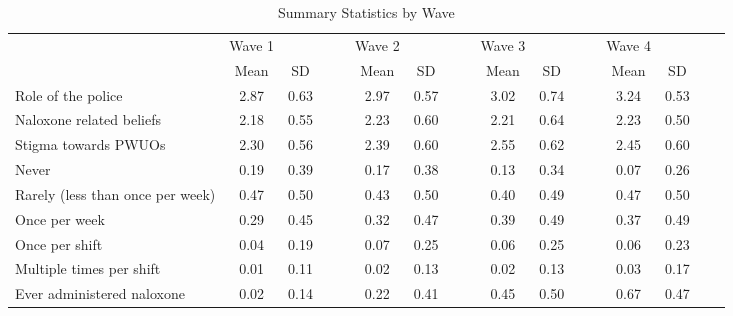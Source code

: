 \begin{sidewaystable}[htbp]\centering
\def\sym#1{\ifmmode^{#1}\else\(^{#1}\)\fi}
\caption{\centering Summary Statistics by Wave}
\begin{tabular}{l*{4}{cccc}}
\hline\hline
                &   Wave 1&         &         &         &   Wave 2&         &         &         &   Wave 3&         &         &         &   Wave 4&         &         &         \\
                &     Mean&       SD&         &         &     Mean&       SD&         &         &     Mean&       SD&         &         &     Mean&       SD&         &         \\
\hline
Role of the police&     2.87&     0.63&         &         &     2.97&     0.57&         &         &     3.02&     0.74&         &         &     3.24&     0.53&         &         \\
Naloxone related beliefs&     2.18&     0.55&         &         &     2.23&     0.60&         &         &     2.21&     0.64&         &         &     2.23&     0.50&         &         \\
Stigma towards PWUOs&     2.30&     0.56&         &         &     2.39&     0.60&         &         &     2.55&     0.62&         &         &     2.45&     0.60&         &         \\
Never           &     0.19&     0.39&         &         &     0.17&     0.38&         &         &     0.13&     0.34&         &         &     0.07&     0.26&         &         \\
Rarely (less than once per week)&     0.47&     0.50&         &         &     0.43&     0.50&         &         &     0.40&     0.49&         &         &     0.47&     0.50&         &         \\
Once per week   &     0.29&     0.45&         &         &     0.32&     0.47&         &         &     0.39&     0.49&         &         &     0.37&     0.49&         &         \\
Once per shift  &     0.04&     0.19&         &         &     0.07&     0.25&         &         &     0.06&     0.25&         &         &     0.06&     0.23&         &         \\
Multiple times per shift&     0.01&     0.11&         &         &     0.02&     0.13&         &         &     0.02&     0.13&         &         &     0.03&     0.17&         &         \\
Ever administered naloxone&     0.02&     0.14&         &         &     0.22&     0.41&         &         &     0.45&     0.50&         &         &     0.67&     0.47&         &         \\

\end{tabular}
\end{sidewaystable}
